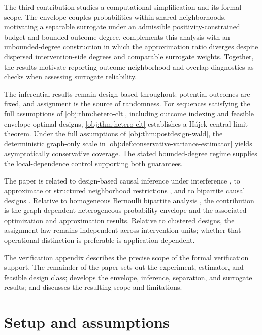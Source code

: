 \documentclass[11pt]{article}
\begin{document}
The third contribution studies a computational simplification and its formal scope. The envelope couples probabilities within shared neighborhoods, motivating a separable surrogate under an admissible positivity-constrained budget and bounded outcome degree.  complements this analysis with an unbounded-degree construction in which the approximation ratio diverges despite dispersed intervention-side degrees and comparable surrogate weights. Together, the results motivate reporting outcome-neighborhood and overlap diagnostics as checks when assessing surrogate reliability.

The inferential results remain design based throughout: potential outcomes are fixed, and assignment is the source of randomness. For sequences satisfying the full assumptions of \cref{obj:thm:hetero-clt}, including outcome indexing and feasible envelope-optimal designs, \cref{obj:thm:hetero-clt} establishes a Hájek central limit theorem. Under the full assumptions of \cref{obj:thm:postdesign-wald}, the deterministic graph-only scale in \cref{obj:def:conservative-variance-estimator} yields asymptotically conservative coverage. The stated bounded-degree regime supplies the local-dependence control supporting both guarantees.

The paper is related to design-based causal inference under interference \citep{HudgensHalloran2008,AronowSamii2017GeneralInterference,SavjeAronowHudgens2021}, to approximate or structured neighborhood restrictions \citep{Leung2019ApproxNeighborhoodInterference}, and to bipartite causal designs \citep{ZiglerPapadogeorgou2018,ChattopadhyayImaiZubizarreta2023GeneralizedNetwork}. Relative to homogeneous Bernoulli bipartite analysis \citep{LuShiFangZhangDing2025BipartiteDesign}, the contribution is the graph-dependent heterogeneous-probability envelope and the associated optimization and approximation results. Relative to clustered designs, the assignment law remains independent across intervention units; whether that operational distinction is preferable is application dependent.

The verification appendix describes the precise scope of the formal verification support. The remainder of the paper sets out the experiment, estimator, and feasible design class; develops the envelope, inference, separation, and surrogate results; and discusses the resulting scope and limitations.


\section{Setup and assumptions}\label{sec:setup-and-assumptions}
\end{document}
